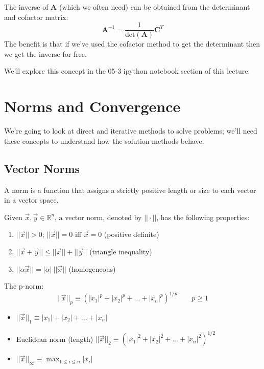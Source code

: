 \documentclass[12pt]{article}
\newcommand{\ve}[1]{\ensuremath{\mathbf{#1}}}
\begin{document}
The inverse of $\ve{A}$ (which we often need) can be obtained from the determinant and cofactor matrix:
%
\begin{equation}
\ve{A}^{-1} = \frac{1}{\text{det}(\ve{A})}\ve{C}^T \nonumber
\end{equation}
%
The benefit is that if we've used the cofactor method to get the determinant then we get the inverse for free. 

We'll explore this concept in the 05-3 ipython notebook section of this lecture.

\section*{Norms and Convergence}
We're going to look at direct and iterative methods to solve problems; we'll need these concepts to understand how the solution methods behave.

\subsection*{Vector Norms}

A norm is a function that assigns a strictly positive length or size to each vector in a vector space.

Given $\vec{x}, \vec{y} \in \mathbb{R}^n$, a vector norm, denoted by $|| \cdot ||$, has the following properties:
%
\begin{enumerate}
\item $||\vec{x}|| > 0$; $||\vec{x}|| = 0$ iff $\vec{x} = 0$ (positive definite)
\item $||\vec{x} + \vec{y}|| \leq ||\vec{x}|| + ||\vec{y}||$ (triangle inequality)
\item $||\alpha \vec{x}|| = |\alpha|\: ||\vec{x}||$ (homogeneous)
\end{enumerate}

The p-norm:
%
\begin{equation}
||\vec{x}||_p \equiv (|x_1|^p + |x_2|^p + \dots + |x_n|^p)^{1/p} \qquad p \geq 1 \nonumber
\end{equation}
%
\begin{itemize}
\item $||\vec{x}||_1 \equiv |x_1| + |x_2| + \dots + |x_n|$
\item Euclidean norm (length) $||\vec{x}||_2 \equiv (|x_1|^2 + |x_2|^2 + \dots + |x_n|^2)^{1/2}$
\item $||\vec{x}||_{\infty} \equiv \displaystyle \max_{1 \leq i \leq n} |x_i|$
\end{itemize}
\end{document}
